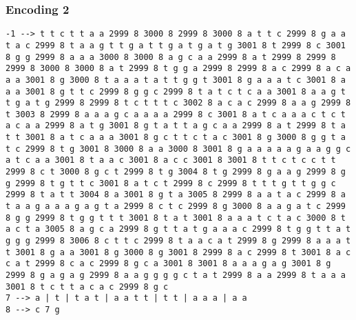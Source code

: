 \subsubsection{Encoding 2}

\begin{verbatim}
-1 --> t t c t t a a 2999 8 3000 8 2999 8 3000 8 a t t c 2999 8 g a a t a c 2999 8 t a a g t t g a t t g a t g a t g 3001 8 t 2999 8 c 3001 8 g g 2999 8 a a a 3000 8 3000 8 a g c a a 2999 8 a t 2999 8 2999 8  2999 8 3000 8 3000 8 a t 2999 8 t g g a 2999 8 2999 8 a c 2999 8 a c a a a 3001 8 g 3000 8 t a a a t a t t g g t 3001 8 g a a a t c 3001 8 a a a 3001 8 g t t c 2999 8 g g c 2999 8 t a t c t c a a 3001 8 a a g t t g a t g 2999 8 2999 8 t c t t t c 3002 8 a c a c 2999 8 a a g 2999 8 t 3003 8 2999 8 a a a g c a a a a 2999 8 c 3001 8 a t c a a a c t c t a c a a 2999 8 a t g 3001 8 g t a t t a g c a a 2999 8 a t 2999 8 t a t t 3001 8 a t c a a a 3001 8 g c t t c t a c 3001 8 g 3000 8 g g t a t c 2999 8 t g 3001 8 3000 8 a a 3000 8 3001 8 g a a a a a g a a g g c a t c a a 3001 8 t a a c 3001 8 a c c 3001 8 3001 8 t t c t c c t t 2999 8 c t 3000 8 g c t 2999 8 t g 3004 8 t g 2999 8 g a a g 2999 8 g g 2999 8 t g t t c 3001 8 a t c t 2999 8 c 2999 8 t t t g t t g g c 2999 8 t a t t 3004 8 a 3001 8 g t a 3005 8 2999 8 a a t a c 2999 8 a t a a g a a a g a g t a 2999 8 c t c 2999 8 g 3000 8 a a g a t c 2999 8 g g 2999 8 t g g t t t 3001 8 t a t 3001 8 a a a t c t a c 3000 8 t a c t a 3005 8 a g c a 2999 8 g t t a t g a a a c 2999 8 t g g t t a t g g g 2999 8 3006 8 c t t c 2999 8 t a a c a t 2999 8 g 2999 8 a a a t t 3001 8 g a a 3001 8 g 3000 8 g 3001 8 2999 8 a c 2999 8 t 3001 8 a c c a t 2999 8 c a c 2999 8 g c a 3001 8 3001 8 a a a g a g 3001 8 g 2999 8 g a g a g 2999 8 a a g g g g c t a t 2999 8 a a 2999 8 t a a a 3001 8 t c t t a c a c 2999 8 g c 
7 --> a | t | t a t | a a t t | t t | a a a | a a 
8 --> c 7 g 
\end{verbatim}

